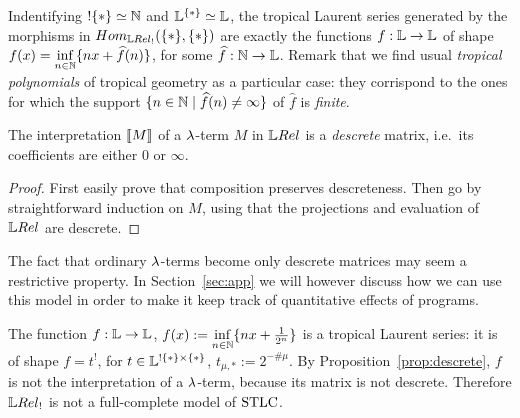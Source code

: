 \begin{remark}
 Indentifying $!\{*\}\simeq \mathbb{N}$ and $\mathbb{L}^{\{*\}}\simeq\mathbb{L}$, the tropical Laurent series generated by the morphisms in $\HOM{\LREL_!}{\set{*}}{\set{*}}$ are exactly the functions $f:\mathbb{L}\to\mathbb{L}$ of shape $f(x)=\inf\limits_{n\in\mathbb{N}}\{nx+\widehat f(n)\}$, for some $\widehat f:\mathbb{N}\to\mathbb{L}$.
Remark that we find usual \emph{tropical polynomials} of tropical geometry as a particular case: they corrispond to the ones for which the support $\{n\in\mathbb{N}\mid\widehat f(n)\neq\infty\}$ of $\widehat f$ is \emph{finite}.
\end{remark}

\begin{proposition}\label{prop:descrete}
 The interpretation $\llbracket M\rrbracket$ of a $\lambda$-term $M$ in $\LREL$ is a \emph{descrete} matrix, i.e.\ its coefficients are either $0$ or $\infty$.
\end{proposition}
\begin{proof}
 First easily prove that composition preserves descreteness.
 Then go by straightforward induction on $M$, using that the projections and evaluation of  $\LREL$ are descrete.
\end{proof}

The fact that ordinary $\lambda$-terms become only descrete matrices may seem a restrictive property.
In Section~\ref{sec:app} we will however discuss how we can use this model in order to make it keep track of quantitative effects of programs.

\begin{example}\label{ex:famous_ex}
 The function $f:\mathbb{L}\to\mathbb{L}$, $f(x):=\inf\limits_{n\in\mathbb{N}}\{nx+\frac{1}{2^n}\}$ is a tropical Laurent series: it is of shape $f=t^!$, for $t\in\mathbb{L}^{!\{*\}\times\{*\}}$, $t_{\mu,*}:=2^{-\# \mu}$.
By Proposition~\ref{prop:descrete}, $f$ is not the interpretation of a $\lambda$-term, because its matrix is not descrete. Therefore $\LREL_!$ is not a full-complete model of $\mathrm{STLC}$.
\end{example}

